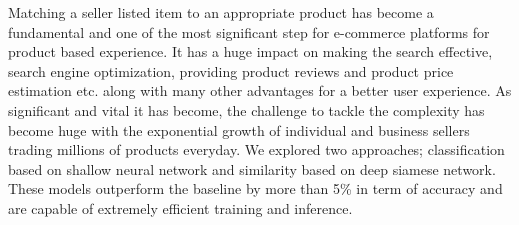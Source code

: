 Matching a seller listed item to an appropriate product has become a fundamental and one of the most significant step for e-commerce platforms for product based experience. It has a huge impact on making the search effective,  search engine optimization,  providing product reviews  and product price estimation etc. along with many other advantages for a better user experience. As significant and vital it has become, the challenge to tackle the complexity has become huge with the exponential growth of individual and business sellers trading millions of products everyday. We explored two approaches; classification based on shallow neural network and similarity based on deep siamese network. These models outperform the baseline by more than 5\% in term of accuracy and are capable of extremely efficient training and inference.
